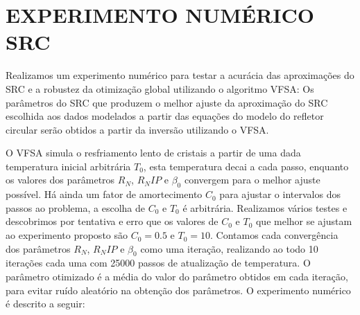 \chapter{EXPERIMENTO NUMÉRICO SRC}
\label{cap5}

Realizamos um experimento numérico para testar a  acurácia das aproximações do SRC e a robustez da otimização
global utilizando o algoritmo VFSA: Os parâmetros do SRC que produzem o melhor
ajuste da aproximação do SRC escolhida aos dados modelados a partir das equações do modelo do refletor circular
serão obtidos a partir da inversão utilizando o VFSA.

O VFSA simula o resfriamento lento de cristais a partir de uma dada temperatura inicial arbitrária 
$T_0$, esta temperatura
decai a cada passo, enquanto os valores dos parâmetros $R_N$, $R_NIP$ e $\beta_0$ convergem para o melhor ajuste possível. 
Há ainda um fator de amortecimento $C_0$ para ajustar o intervalos dos passos ao problema, a
escolha de $C_0$ e $T_0$ é arbitrária.
Realizamos vários
testes e descobrimos por tentativa e erro que os valores de $C_0$ e $T_0$ que melhor se ajustam ao experimento
proposto são $C_0=0.5$ e $T_0=10$.
Contamos cada convergência dos parâmetros $R_N$, $R_NIP$ e $\beta_0$ como uma iteração,
realizando ao todo  10 iterações cada uma com 25000 passos de atualização de temperatura.
O parâmetro otimizado é a média do valor do parâmetro obtidos em cada iteração, para evitar
ruído aleatório na obtenção dos parâmetros.
O experimento numérico é descrito a seguir:

